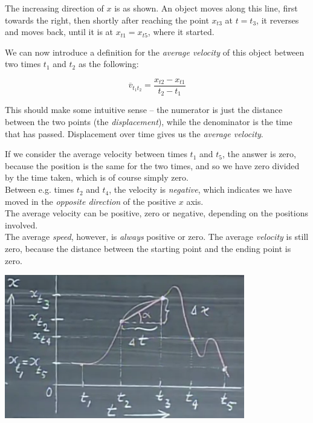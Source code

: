 \documentclass[8.01x]{subfiles}
\begin{document}
The increasing direction of $x$ is as shown. An object moves along this line, first towards the right, then shortly after reaching the point $x_{t3}$ at  $t = t_3$, it reverses and moves back, until it is at $x_{t1} = x_{t5}$, where it started.

We can now introduce a definition for the \emph{average velocity} of this object between two times $t_1$ and $t_2$ as the following:

\begingroup
\large
\begin{equation}
 \overbar{v}_{t_1 t_2} = \frac{x_{t2} - x_{t1}}{t_2 - t_1}
\end{equation}
\endgroup

This should make some intuitive sense -- the numerator is just the distance between the two points (the \emph{displacement}), while the denominator is the time that has passed. Displacement over time gives us the \emph{average velocity}.

If we consider the average velocity between times $t_1$ and $t_5$, the answer is zero, because the position is the same for the two times, and so we have zero divided by the time taken, which is of course simply zero.\\
Between e.g. times $t_2$ and $t_4$, the velocity is \emph{negative}, which indicates we have moved in the \emph{opposite direction} of the positive $x$ axis.\\
The average velocity can be positive, zero or negative, depending on the positions involved.\\
The average \emph{speed}, however, is \emph{always} positive or zero. The average \emph{velocity} is still zero, because the distance between the starting point and the ending point is zero.

\begin{center}
\includegraphics[scale=0.75]{Graphics/1d-motion-graph}
\end{center}
\end{document}
